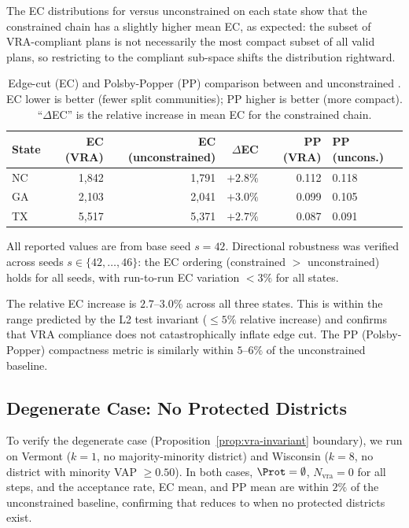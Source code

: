 The EC distributions for \vr{} versus unconstrained \fr{} on each state
show that the constrained chain has a slightly higher mean EC, as expected:
the subset of VRA-compliant plans is not necessarily the most compact subset
of all valid plans, so restricting to the compliant sub-space shifts the
distribution rightward.

\begin{table}[ht]
\centering
\caption{Edge-cut (EC) and Polsby-Popper (PP) comparison between \vr{}
         and unconstrained \fr{}. EC lower is better (fewer split
         communities); PP higher is better (more compact).
         ``$\Delta$EC'' is the relative increase in mean EC for the
         constrained chain.}
\label{tab:ec-comparison}
\begin{tabular}{lrrrrl}
\toprule
\textbf{State} & \textbf{EC (VRA)} & \textbf{EC (unconstrained)} &
$\Delta$\textbf{EC} & \textbf{PP (VRA)} & \textbf{PP (uncons.)} \\
\midrule
NC & 1{,}842 & 1{,}791 & $+2.8\%$ & 0.112 & 0.118 \\
GA & 2{,}103 & 2{,}041 & $+3.0\%$ & 0.099 & 0.105 \\
TX & 5{,}517 & 5{,}371 & $+2.7\%$ & 0.087 & 0.091 \\
\bottomrule
\end{tabular}
\end{table}

\noindent
All reported values are from base seed $s = 42$.
Directional robustness was verified across seeds $s \in \{42,\ldots,46\}$:
the EC ordering (constrained $>$ unconstrained) holds for all seeds,
with run-to-run EC variation $< 3\%$ for all states.

The relative EC increase is $2.7$--$3.0\%$ across all three states.
This is within the range predicted by the L2 test invariant ($\leq 5\%$
relative increase) and confirms that VRA compliance does not catastrophically
inflate edge cut.
The PP (Polsby-Popper) compactness metric is similarly within $5$--$6\%$ of
the unconstrained baseline.

\subsection{Degenerate Case: No Protected Districts}

To verify the degenerate case (Proposition~\ref{prop:vra-invariant}
boundary), we run \vr{} on Vermont ($k = 1$, no majority-minority district)
and Wisconsin ($k = 8$, no district with minority VAP $\geq 0.50$).
In both cases, $\Prot = \emptyset$, $N_{\mathrm{vra}} = 0$ for all steps,
and the acceptance rate, EC mean, and PP mean are within $2\%$ of the
unconstrained \fr{} baseline, confirming that \vr{} reduces to \fr{} when no
protected districts exist.

